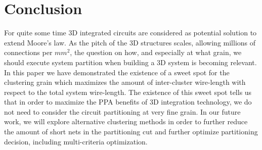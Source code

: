 \documentclass[conference]{IEEEtran}
\begin{document}
\section{Conclusion}\label{sec:concl}
For quite some time 3D integrated circuits are considered as potential solution to extend Moore's law. As the pitch of the 3D structures scales, allowing millions of connections per $mm^2$, the question on how, and especially at what grain, we should execute system partition when building a 3D system is becoming relevant. In this paper we have demonstrated the existence of a sweet spot for the clustering grain which maximizes the amount of inter-cluster wire-length with respect to the total system wire-length. The existence of this sweet spot tells us that in order to maximize the PPA benefits of 3D integration technology, we do not need to consider the circuit partitioning at very fine grain. In our future work, we will explore alternative clustering methods in order to further reduce the amount of short nets in the partitioning cut and further optimize partitioning decision, including multi-criteria optimization.






%


\end{document}
